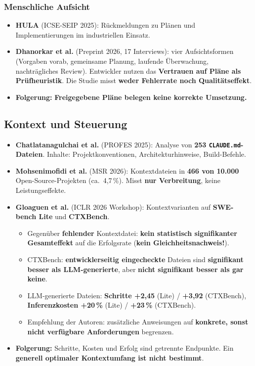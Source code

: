 \documentclass[12pt,a4paper]{article}
\newcommand{\quelle}[1]{\textcolor{grau}{(#1)}}
\begin{document}
\subsubsection*{Menschliche Aufsicht}
\begin{itemize}
  \item \textbf{HULA} \quelle{ICSE-SEIP 2025}: Rückmeldungen zu Plänen und Implementierungen im industriellen Einsatz.
  \item \textbf{Dhanorkar et al.} \quelle{Preprint 2026, 17 Interviews}: vier Aufsichtsformen (Vorgaben vorab, gemeinsame Planung, laufende Überwachung, nachträgliches Review). Entwickler nutzen das \textbf{Vertrauen auf Pläne als Prüfheuristik}. Die Studie misst \textbf{weder Fehlerrate noch Qualitätseffekt}.
  \item \textbf{Folgerung:} \textbf{Freigegebene Pläne belegen keine korrekte Umsetzung.}
\end{itemize}

\subsection{Kontext und Steuerung}
\begin{itemize}
  \item \textbf{Chatlatanagulchai et al.} \quelle{PROFES 2025}: Analyse von \textbf{253 \texttt{CLAUDE.md}-Dateien}. Inhalte: Projektkonventionen, Architekturhinweise, Build-Befehle.
  \item \textbf{Mohsenimofidi et al.} \quelle{MSR 2026}: Kontextdateien in \textbf{466 von 10.000} Open-Source-Projekten (ca.\ 4,7\,\%). Misst \textbf{nur Verbreitung}, keine Leistungseffekte.
  \item \textbf{Gloaguen et al.} \quelle{ICLR 2026 Workshop}: Kontextvarianten auf \textbf{SWE-bench Lite} und \textbf{CTXBench}.
  \begin{itemize}
    \item Gegenüber \textbf{fehlender} Kontextdatei: \textbf{kein statistisch signifikanter Gesamteffekt} auf die Erfolgsrate (\textbf{kein Gleichheitsnachweis!}).
    \item CTXBench: \textbf{entwicklerseitig eingecheckte} Dateien sind \textbf{signifikant besser als LLM-generierte}, aber \textbf{nicht signifikant besser als gar keine}.
    \item LLM-generierte Dateien: \textbf{Schritte +2,45} (Lite) / \textbf{+3,92} (CTXBench), \textbf{Inferenzkosten +20\,\%} (Lite) / \textbf{+23\,\%} (CTXBench).
    \item Empfehlung der Autoren: zusätzliche Anweisungen auf \textbf{konkrete, sonst nicht verfügbare Anforderungen} begrenzen.
  \end{itemize}
  \item \textbf{Folgerung:} Schritte, Kosten und Erfolg sind getrennte Endpunkte. Ein \textbf{generell optimaler Kontextumfang ist nicht bestimmt}.
\end{itemize}
\end{document}
